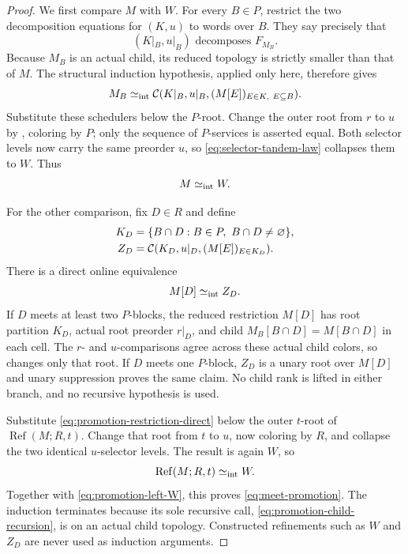 \begin{proof}
We first compare \(M\) with \(W\).  For every \(B\in P\), restrict the two
decomposition equations for \((K,u)\) to words over \(B\).  They say precisely
that
\begin{equation}
 (K|_B,u|_B)\text{ decomposes }F_{M_B}.
 \label{eq:promotion-child-decomposition}
\end{equation}
Because \(M_B\) is an actual child, its reduced topology is strictly smaller
than that of \(M\).  The structural induction hypothesis, applied only here,
therefore gives
\begin{equation}
 M_B\mathrel{\simeq_{\mathrm{int}}}
 \mathcal C(K|_B,u|_B,(M[E])_{E\in K,\ E\subseteq B}).
 \label{eq:promotion-child-recursion}
\end{equation}
Substitute these schedulers below the \(P\)-root.  Change the outer root from
\(r\) to \(u\) by , coloring by \(P\); only the sequence of
\(P\)-services is asserted equal.  Both selector levels now carry the same
preorder \(u\), so \autoref{eq:selector-tandem-law} collapses them to \(W\).
Thus
\begin{equation}
 M\mathrel{\simeq_{\mathrm{int}}} W.
 \label{eq:promotion-left-W}
\end{equation}

For the other comparison, fix \(D\in R\) and define
\begin{align}
 K_D&=\{B\cap D:B\in P,\ B\cap D\ne\varnothing\},\notag\\
 Z_D&=\mathcal C(K_D,u|_D,(M[E])_{E\in K_D}).
 \label{eq:promotion-ZD}
\end{align}
There is a direct online equivalence
\begin{equation}
 M[D]\mathrel{\simeq_{\mathrm{int}}} Z_D.
 \label{eq:promotion-restriction-direct}
\end{equation}
If \(D\) meets at least two \(P\)-blocks, the reduced restriction \(M[D]\)
has root partition \(K_D\), actual root preorder \(r|_D\), and child
\(M_B[B\cap D]=M[B\cap D]\) in each cell.  The \(r\)- and \(u\)-comparisons
agree across these actual child colors, so  changes only
that root.  If \(D\) meets one \(P\)-block, \(Z_D\) is a unary root over
\(M[D]\) and unary suppression proves the same claim.  No child rank is
lifted in either branch, and no recursive hypothesis is used.

Substitute \eqref{eq:promotion-restriction-direct} below the outer \(t\)-root
of \(\operatorname{Ref}(M;R,t)\).  Change that root from \(t\) to \(u\), now
coloring by \(R\), and collapse the two identical \(u\)-selector levels.  The
result is again \(W\), so
\begin{equation}
 \operatorname{Ref}(M;R,t)\mathrel{\simeq_{\mathrm{int}}} W.
 \label{eq:promotion-right-W}
\end{equation}
Together with \eqref{eq:promotion-left-W}, this proves
\eqref{eq:meet-promotion}.  The induction terminates because its sole
recursive call, \eqref{eq:promotion-child-recursion}, is on an actual child
topology.  Constructed refinements such as \(W\) and \(Z_D\) are never used as
induction arguments.
\end{proof}

